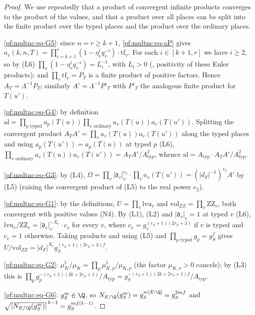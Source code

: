 \begin{proof}
We use repeatedly that a product of convergent infinite products converges to the product of the values, and that a
product over all places can be split into the finite product over the typed places and the product over the ordinary places.

\eqref{pf:multnc:eq-G5}: since $n=r\ge k+1$, \eqref{pf:multnc:eq-aP} gives
$a_v(k,n,T)=\prod_{i=k+1}^{r}(1-\eta_v^iq_v^{-i})\cdot\mathrm{tf}_v$. For each $i\in[k+1,r]$ we have $i\ge2$, so by (L6)
$\prod_v(1-\eta_v^iq_v^{-i})=L_i^{-1}$, with $L_i>0$ (, positivity
of these Euler products); and $\prod_v\mathrm{tf}_v=P_T$ is a finite product of positive factors. Hence $A_T=\Lambda^{-1}P_T$;
similarly $A'=\Lambda^{-1}P'_T$ with $P'_T$ the analogous finite product for $T(u')$.

\eqref{pf:multnc:eq-G4}: by definition $\mathrm{al}=\prod_{p\text{ typed}}a_p(T(u))\prod_{v\text{ ordinary}}a_v(T(u))
a_v(T(u'))$. Splitting the convergent product $A_TA'=\prod_va_v(T(u))a_v(T(u'))$ along the typed places and using
$a_p(T(u'))=a_p(T(u))$ at typed $p$ (L6), $\prod_{v\text{ ordinary}}a_v(T(u))a_v(T(u'))=A_TA'/A_{\mathrm{typ}}^2$, whence
$\mathrm{al}=A_{\mathrm{typ}}\cdot A_TA'/A_{\mathrm{typ}}^2$.

\eqref{pf:multnc:eq-G3}: by (L4), $\Omega=\prod_v|\mathfrak d_v|_v^{e_2}\cdot\prod_va_v(T(u'))=(|d_F|^{-1})^{e_2}A'$ by (L5)
(raising the convergent product of (L5) to the real power $e_2$).

\eqref{pf:multnc:eq-G1}: by the definitions, $U=\prod_v\mathrm{lvu}_v$ and $\mathrm{vol}_{ZZ}=\prod_v\mathrm{ZZ}_v$, both
convergent with positive values (N4). By (L1), (L2) and $|\mathfrak d_v|_v=1$ at typed $v$ (L6),
$\mathrm{lvu}_v/\mathrm{ZZ}_v=|\mathfrak d_v|_v^{-X_e}\cdot c_v$ for every $v$, where $c_v=g_v^{(r_S+1)(2r_S+3)}$ if $v$ is
typed and $c_v=1$ otherwise. Taking products and using (L5) and $\prod_{p\text{ typed}}g_p=g_S^f$ gives
$U/\mathrm{vol}_{ZZ}=|d_F|^{X_e}g_S^{(r_S+1)(2r_S+3)f}$.

\eqref{pf:multnc:eq-G2}: $\mu_K^\natural/\mu_K=\prod_p\mu^\natural_{K,p}/\mu_{K,p}$ (the factor $\mu_{K,o}>0$ cancels); by (L3)
this is $\prod_pg_p^{-(r_S+1)(2k+2r_S+1)}/A_{\mathrm{typ}}=g_S^{-(r_S+1)(2k+2r_S+1)f}/A_{\mathrm{typ}}$.

\eqref{pf:multnc:eq-G6}: $g_S^m\in\Q$, so $N_{E/\Q}(g_S^m)=g_S^{m[E:\Q]}=g_S^{2mf}$ and
$\sqrt{|N_{E/\Q}(g_S^m)|}^{\,k-1}=g_S^{mf(k-1)}$.
\end{proof}

